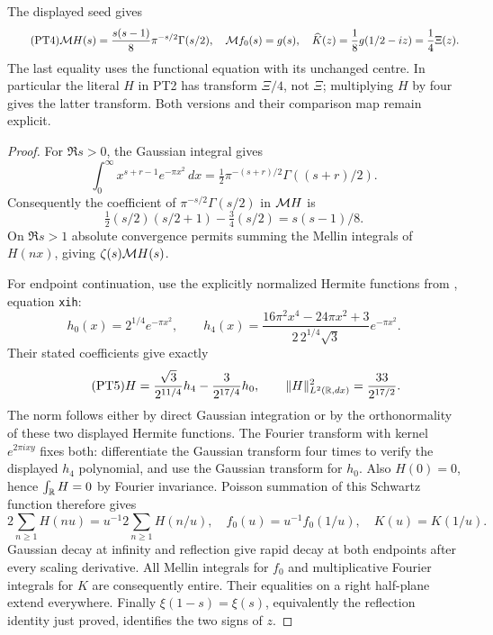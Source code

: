 \documentclass[11pt]{article}
\begin{document}
\begin{swthetatheorem}
The displayed seed gives
\begin{equation}\tag{PT4}
 \mathcal M H(s)=\frac{s(s-1)}8\pi^{-s/2}\Gamma(s/2),\quad
 \mathcal M f_0(s)=g(s),\quad
 \widehat K(z)=\frac18g(1/2-iz)=\frac14\Xi(z).
\end{equation}
The last equality uses the functional equation with its unchanged
centre. In particular the literal $H$ in PT2 has transform
$\Xi/4$, not $\Xi$; multiplying $H$ by four gives the latter
transform. Both versions and their comparison map remain explicit.
\end{swthetatheorem}
\begin{proof}
For $\Re s>0$, the Gaussian integral gives
\[
 \int_0^\infty x^{s+r-1}e^{-\pi x^2}\,dx
  =\tfrac12\pi^{-(s+r)/2}\Gamma((s+r)/2).
\]
Consequently the coefficient of
$\pi^{-s/2}\Gamma(s/2)$ in $\mathcal M H$ is
\[
 \tfrac12(s/2)(s/2+1)-\tfrac34(s/2)=s(s-1)/8.
\]
On $\Re s>1$ absolute convergence permits summing the Mellin
integrals of $H(nx)$, giving $\zeta(s)\mathcal M H(s)$.

For endpoint continuation, use the explicitly normalized Hermite
functions from \cite{swtheta:CCM}, equation \texttt{xih}:
\[
 h_0(x)=2^{1/4}e^{-\pi x^2},\qquad
 h_4(x)=\frac{16\pi^2x^4-24\pi x^2+3}{2\,2^{1/4}\sqrt3}
                                  e^{-\pi x^2}.
\]
Their stated coefficients give exactly
\begin{equation}\tag{PT5}
 H=\frac{\sqrt3}{2^{11/4}}h_4-\frac3{2^{17/4}}h_0,
 \qquad \|H\|_{L^2(\mathbb R,dx)}^2=\frac{33}{2^{17/2}}.
\end{equation}
The norm follows either by direct Gaussian integration or by the
orthonormality of these two displayed Hermite functions.
The Fourier transform with kernel $e^{2\pi ixy}$ fixes both:
differentiate the Gaussian transform four times to verify the
displayed $h_4$ polynomial, and use the Gaussian transform for $h_0$.
Also $H(0)=0$, hence $\int_\mathbb R H=0$ by Fourier invariance.
Poisson summation of this Schwartz function therefore gives
\[
 2\sum_{n\geq1}H(nu)=u^{-1}2\sum_{n\geq1}H(n/u),
 \quad f_0(u)=u^{-1}f_0(1/u),\quad K(u)=K(1/u).
\]
Gaussian decay at infinity and reflection give rapid decay at
both endpoints after every scaling derivative. All Mellin
integrals for $f_0$ and multiplicative Fourier integrals for $K$
are consequently entire. Their equalities on a right half-plane
extend everywhere. Finally $\xi(1-s)=\xi(s)$, equivalently the
reflection identity just proved, identifies the two signs of $z$.
\end{proof}
\end{document}
